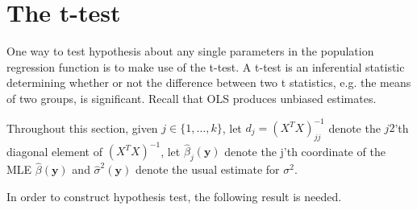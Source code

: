 \section{The t-test}
One way to test hypothesis about any single parameters in the population regression function is to make use of the t-test. 
A t-test is an inferential statistic determining whether or not the difference between two t statistics, e.g. the means of two groups, is significant. 
Recall that OLS produces unbiased estimates. 

Throughout this section, given $j\in\{ 1, \ldots, k\}$, let $d_j=(X^TX)^{-1}_{jj}$ denote the $j2$'th diagonal element of $(X^TX)^{-1}$, let $\hat{\beta}_j(\textbf{y})$ denote the j'th coordinate of the MLE $\hat{\beta}(\textbf{y})$ and $\hat{\sigma}^2(\textbf{y})$ denote the usual estimate for $\sigma^2$.

In order to construct hypothesis test, the following result is needed.

